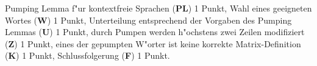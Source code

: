 \begin{bewertung}
Pumping Lemma f"ur kontextfreie Sprachen ({\bf PL}) 1 Punkt,
Wahl eines geeigneten Wortes ({\bf W}) 1 Punkt,
Unterteilung entsprechend der Vorgaben des Pumping Lemmas ({\bf U}) 1 Punkt,
durch Pumpen werden h"ochstens zwei Zeilen modifiziert ({\bf Z}) 1 Punkt,
eines der gepumpten W"orter ist keine korrekte Matrix-Definition ({\bf K})
1 Punkt,
Schlussfolgerung ({\bf F}) 1 Punkt.
\end{bewertung}
